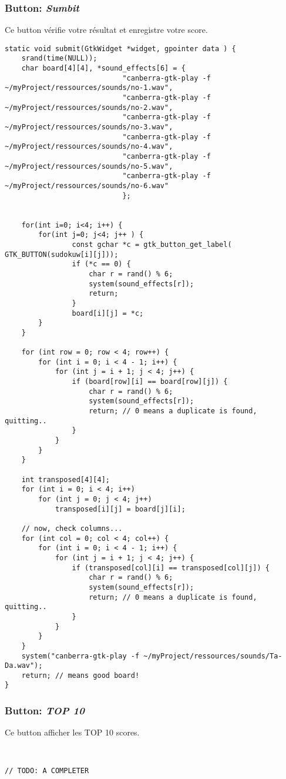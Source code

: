 \documentclass{article}
\begin{document}
\subsubsection{Button: \textit{Sumbit}}
Ce button vérifie votre résultat et enregistre votre score.
\begin{lstlisting}[style=CStyle]
static void submit(GtkWidget *widget, gpointer data ) {
	srand(time(NULL));
	char board[4][4], *sound_effects[6] = {
							"canberra-gtk-play -f ~/myProject/ressources/sounds/no-1.wav",
							"canberra-gtk-play -f ~/myProject/ressources/sounds/no-2.wav", 
							"canberra-gtk-play -f ~/myProject/ressources/sounds/no-3.wav", 
							"canberra-gtk-play -f ~/myProject/ressources/sounds/no-4.wav", 
							"canberra-gtk-play -f ~/myProject/ressources/sounds/no-5.wav", 
							"canberra-gtk-play -f ~/myProject/ressources/sounds/no-6.wav"
							};
							
							
	for(int i=0; i<4; i++) {
		for(int j=0; j<4; j++ ) {
				const gchar *c = gtk_button_get_label( GTK_BUTTON(sudokuw[i][j]));
				if (*c == 0) {
					char r = rand() % 6;
					system(sound_effects[r]);
					return;
				}
				board[i][j] = *c;
		}
	}
	
	for (int row = 0; row < 4; row++) {
		for (int i = 0; i < 4 - 1; i++) {
			for (int j = i + 1; j < 4; j++) {
				if (board[row][i] == board[row][j]) {
				    char r = rand() % 6;
					system(sound_effects[r]);
					return; // 0 means a duplicate is found, quitting..
				}
			}
		}
	}
	
	int transposed[4][4];
    for (int i = 0; i < 4; i++) 
        for (int j = 0; j < 4; j++) 
            transposed[i][j] = board[j][i];
	
	// now, check columns... 
	for (int col = 0; col < 4; col++) {
		for (int i = 0; i < 4 - 1; i++) {
			for (int j = i + 1; j < 4; j++) {
				if (transposed[col][i] == transposed[col][j]) {
				    char r = rand() % 6;
					system(sound_effects[r]);
					return; // 0 means a duplicate is found, quitting..
				}
			}
		}
	}
	system("canberra-gtk-play -f ~/myProject/ressources/sounds/Ta-Da.wav");
	return; // means good board!
}

\end{lstlisting}

\subsubsection{Button: \textit{TOP 10}}
Ce button afficher les TOP 10 scores.
\begin{lstlisting}[style=CStyle]


// TODO: A COMPLETER


\end{lstlisting}
\end{document}
